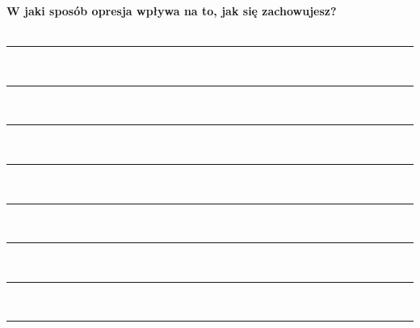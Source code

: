 \newpage
\noindent
\textcolor{ProcessBlue}{\textbf{\Large{W jaki sposób opresja wpływa na to, jak się zachowujesz?}}}\\\\
\noindent\rule{\textwidth}{1pt}\\
\noindent\rule{\textwidth}{1pt}\\
\noindent\rule{\textwidth}{1pt}\\
\noindent\rule{\textwidth}{1pt}\\
\noindent\rule{\textwidth}{1pt}\\
\noindent\rule{\textwidth}{1pt}\\
\noindent\rule{\textwidth}{1pt}\\
\noindent\rule{\textwidth}{1pt}\\\\

